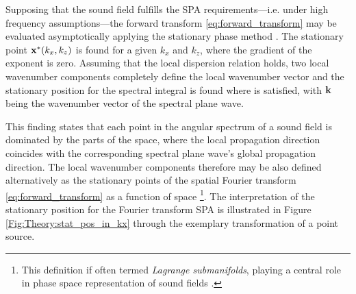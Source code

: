 Supposing that the sound field fulfills the SPA requirements---i.e. under high frequency assumptions---the forward transform \eqref{eq:forward_transform}
may be evaluated asymptotically applying the stationary phase method \cite{Arnold1995, Tinkelman2005}.
The stationary point $\mathbf{x}^*(k_x,k_z)$ is found for a given $k_x$ and $k_z$, where the gradient of the exponent is zero.
Assuming that the local dispersion relation holds, two local wavenumber components completely define the local wavenumber vector and the stationary position for the spectral integral is found where
is satisfied, with $\mathbf{k}$ being the wavenumber vector of the spectral plane wave.

This finding states that each point in the angular spectrum of a sound field is dominated by the parts of the space, where the local propagation direction coincides with the corresponding spectral plane wave's global propagation direction.
The local wavenumber components therefore may be also defined alternatively as the stationary points of the spatial Fourier transform \eqref{eq:forward_transform} as a function of space \footnote{This definition if often termed \emph{Lagrange submanifolds}, playing a central role in phase space representation of sound fields \cite{Steinberg1993, Arnold1995, Tinkelman2005}.}.
The interpretation of the stationary position for the Fourier transform SPA is illustrated in Figure \ref{Fig:Theory:stat_pos_in_kx} through the exemplary transformation of a point source.

